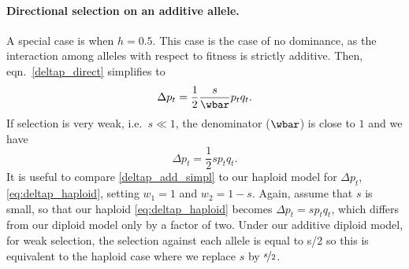 


\paragraph{Directional selection on an additive allele.}
A special case is when $h = 0.5$. This case is the case of no dominance, as the interaction among alleles with respect to fitness is strictly additive. Then, eqn.\ \eqref{deltap_direct} simplifies to
\begin{equation}
	\Delta p_t = \frac{1}{2}\frac{s}{\wbar}p_tq_t .
	\label{deltap_add}
\end{equation}
If selection is very weak, i.e.\ $s \ll 1$, the denominator ($\wbar$) is close to $1$ and we have
\begin{equation}
	\Delta p_t = \frac{1}{2} s p_t q_t .
	\label{deltap_add_simpl}
\end{equation}
It is useful to compare \eqn \eqref{deltap_add_simpl} to our haploid
model for $\Delta p_t$, \eqn \eqref{eq:deltap_haploid}, setting $w_1
= 1$ and $w_2 = 1-s$. Again, assume that $s$ is small, so that our
haploid \eqn \eqref{eq:deltap_haploid} becomes $\Delta p_t = s p_t
q_t$, which differs from our diploid model only by a factor of two.
Under our additive diploid model, for weak selection, the selection against each
allele is equal to s/2 so this is equivalent to the haploid case where
we replace $s$ by $\nicefrac{s}{2}$.


